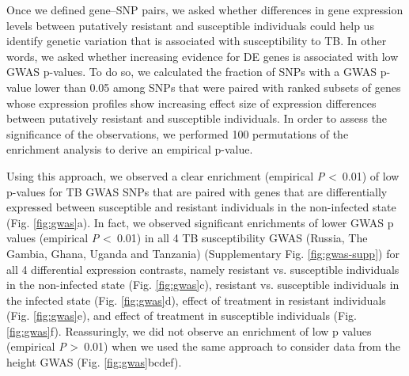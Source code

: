 \documentclass[fleqn,10pt]{wlscirep}
\begin{document}
Once we defined gene–SNP pairs, we asked whether differences in gene
expression levels between putatively resistant and susceptible
individuals could help us identify genetic variation that is
associated with susceptibility to TB. In other words, we asked whether
increasing evidence for DE genes is associated with low GWAS p-values.
To do so, we calculated the fraction of SNPs with a GWAS p-value lower
than 0.05 among SNPs that were paired with ranked subsets of genes
whose expression profiles show increasing effect size of expression
differences between putatively resistant and susceptible individuals.
In order to assess the significance of the observations, we performed
100 permutations of the enrichment analysis to derive an empirical
p-value.

Using this approach, we observed a clear enrichment (empirical
\emph{P} \textless \, 0.01) of low p-values for TB GWAS SNPs that are
paired with genes that are differentially expressed between
susceptible and resistant individuals in the non-infected state (Fig.
\ref{fig:gwas}a). In fact, we observed significant enrichments of
lower GWAS p values (empirical \emph{P} \textless \, 0.01) in all 4 TB
susceptibility GWAS (Russia, The Gambia, Ghana, Uganda and Tanzania)
(Supplementary Fig. \ref{fig:gwas-supp}) for all 4 differential
expression contrasts, namely resistant vs. susceptible individuals in
the non-infected state (Fig. \ref{fig:gwas}c), resistant vs.
susceptible individuals in the infected state (Fig. \ref{fig:gwas}d),
effect of treatment in resistant individuals (Fig. \ref{fig:gwas}e),
and effect of treatment in susceptible individuals (Fig.
\ref{fig:gwas}f). Reassuringly, we did not observe an enrichment of
low p values (empirical \emph{P} \textgreater \, 0.01) when we used
the same approach to consider data from the height GWAS (Fig.
\ref{fig:gwas}bcdef).
\end{document}
